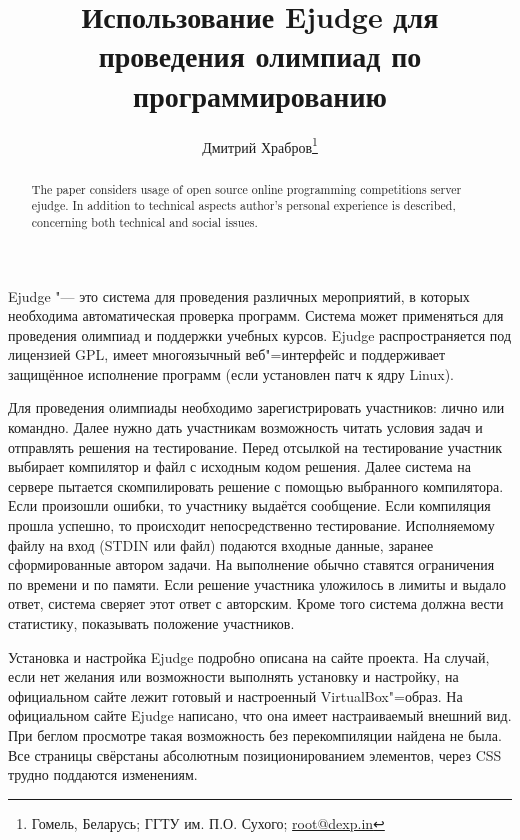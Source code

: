 \documentclass[10pt, a5paper]{article}
\begin{document}
\title{Использование Ejudge для проведения олимпиад по программированию}%

\author{Дмитрий Храбров\footnote{Гомель, Беларусь; ГГТУ им. П.О. Сухого; \url{root@dexp.in}}}
\maketitle

\begin{abstract}
The paper considers usage of open source online programming competitions server ejudge. In addition to technical aspects \linebreak author's personal experience is described, concerning both \linebreak technical and social issues.
\end{abstract}

 Ejudge "--- это система для проведения различных мероприятий, в которых необходима автоматическая проверка программ. Система может применяться для проведения олимпиад и поддержки учебных курсов. Ejudge распространяется под лицензией GPL, имеет многоязычный веб"=интерфейс и поддерживает защищённое исполнение программ (если установлен патч к ядру Linux).

Для проведения олимпиады необходимо зарегистрировать участников: лично или командно. Далее нужно дать участникам возможность читать условия задач и отправлять решения на тестирование. Перед отсылкой на тестирование участник выбирает компилятор и файл с исходным кодом решения. Далее система на сервере пытается скомпилировать решение с помощью выбранного компилятора. Если произошли ошибки, то участнику выдаётся сообщение. Если компиляция прошла успешно, то происходит непосредственно тестирование. Исполняемому файлу на вход (STDIN или файл) подаются входные данные, заранее сформированные автором задачи. На выполнение обычно ставятся ограничения по времени и по памяти. Если решение участника уложилось в лимиты и выдало ответ, система сверяет этот ответ с авторским. Кроме того система должна вести статистику, показывать положение участников. 

Установка и настройка Ejudge подробно описана на сайте проекта. На случай, если нет желания или возможности выполнять установку и настройку, на официальном сайте лежит готовый и настроенный VirtualBox"=образ. На официальном сайте Ejudge написано, что она имеет настраиваемый внешний вид. При беглом просмотре такая возможность без перекомпиляции найдена не была. Все страницы свёрстаны абсолютным позиционированием элементов, через CSS трудно поддаются изменениям.
\end{document}
